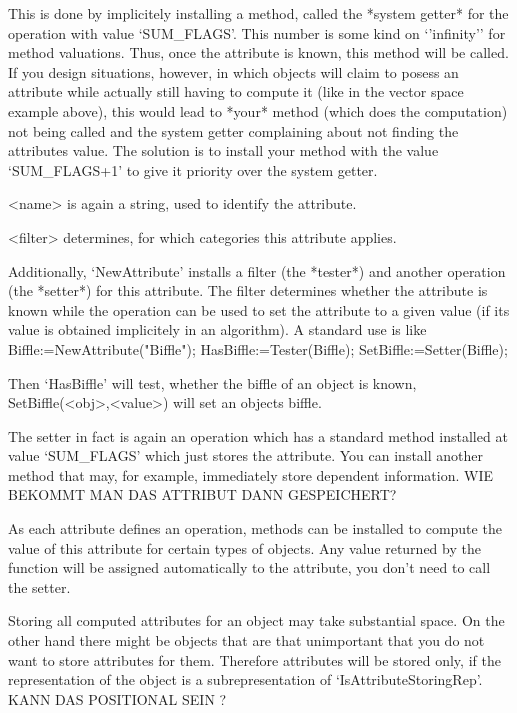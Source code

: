 \danger
This is done by implicitely installing a method, called the *system getter*
for the operation with value `SUM_FLAGS'. This number is some kind on
`'infinity'' for method valuations. Thus, once the attribute is known, this
method will be called. If you design situations, however, in
which objects will claim to posess an attribute while actually still having
to compute it (like in the vector space example above), this would lead to
*your* method (which does the computation) not being called and the system
getter complaining about not finding the attributes value. The solution is 
to install your method with the value `SUM_FLAGS+1' to give it priority
over the system getter.

<name> is again a string, used to identify the attribute.

<filter> determines, for which categories this attribute applies.

Additionally, `NewAttribute' installs a filter (the *tester*) and another
operation (the *setter*) for this attribute. The
filter determines whether the attribute is known while the operation can be
used to set the attribute to a given value (if its value is obtained
implicitely in an algorithm). A standard use is like
\beginexample
Biffle:=NewAttribute("Biffle");
HasBiffle:=Tester(Biffle);
SetBiffle:=Setter(Biffle);
\endexample

Then `HasBiffle' will test, whether the biffle of an object is known,
SetBiffle(<obj>,<value>) will set an objects biffle.

\danger
The setter in fact is again an operation which has a standard method
installed at value `SUM_FLAGS' which just stores the attribute. You can
install another method that may, for example, immediately store
dependent information. WIE BEKOMMT MAN DAS ATTRIBUT DANN GESPEICHERT?

As each attribute defines an operation, methods can be installed to compute 
the value of this attribute for certain types of objects. Any value returned
by the function will be assigned automatically to the attribute, you don't
need to call the setter.

\danger
Storing all computed attributes for an object may take substantial space. On
the other hand there might be objects that are that unimportant that you
do not want to store attributes for them. Therefore attributes will be
stored only, if the representation of the object is a subrepresentation of
`IsAttributeStoringRep'. KANN DAS POSITIONAL SEIN ?

